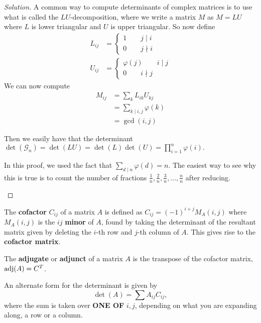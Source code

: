 \begin{proof}[Solution]
A common way to compute determinants of complex matrices is to use what
is called the $LU$-decomposition, where we write a matrix $M$ as $M =
LU$ where $L$ is lower triangular and $U$ is upper triangular. So now
define
\[ \begin{aligned}
L_{ij} &= \left\lbrace \begin{aligned}
1 \qquad j \mid i \\
0 \qquad j \nmid i
\end{aligned}\right. \\
U_{ij} &= \left\lbrace \begin{aligned}
\varphi(j) \qquad i \mid j \\
0 \qquad i \nmid j
\end{aligned}\right.
\end{aligned} \]
We can now compute
\[ \begin{aligned}
M_{ij} &= \sum_k L_{ik} U_{kj} \\
&= \sum_{k \mid i, j} \varphi(k) \\
&= \gcd(i, j)
\end{aligned} \]

Then we easily have that the determinant $\det(\mathcal{G}_n) = \det(LU)
= \det(L) \det(U) = \prod_{i = 1}^{n} \varphi(i).$

\begin{rem}
In this proof, we used the fact that $\sum_{d \mid n} \varphi(d) = n$.
The easiest way to see why this is true is to count the number of
fractions $\frac{1}{n}, \frac{2}{n}, \frac{3}{n}, \dots, \frac{n}{n}$
after reducing.
\end{rem}
\end{proof}

\begin{df}
The \textbf{cofactor} $C_{ij}$ of a matrix $A$ is defined as $C_{ij} =
(-1)^{i + j} M_A(i, j)$ where $M_A(i, j)$ is the $ij$ \textbf{minor} of
$A$, found by taking the determinant of the resultant matrix given by
deleting the $i$-th row and $j$-th column of $A$. This gives rise to the
\textbf{cofactor matrix}.
\end{df}

\begin{df}
The \textbf{adjugate} or \textbf{adjunct} of a matrix $A$ is the
transpose of the cofactor matrix, $\operatorname{adj}(A) = C^T$.
\end{df}

\begin{thm}
An alternate form for the determinant is given by
\[ \det(A) = \sum A_{ij} C_{ij}, \]
where the sum is taken over \textbf{ONE OF} $i, j$, depending on what
you are expanding along, a row or a column.
\end{thm}


